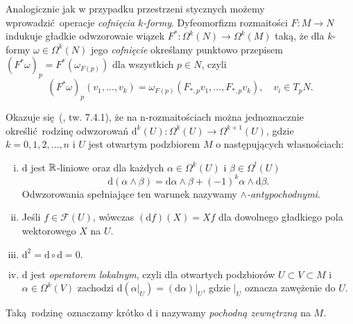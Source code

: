 


Analogicznie jak w przypadku przestrzeni stycznych możemy wprowadzić operacje \emph{cofnięcia \(k\)-formy}. Dyfeomorfizm rozmaitości \(F:M\to N\) indukuje gładkie odwzorowaie wiązek \(F^\ast:\Omega^k(N)\to\Omega^{k}(M)\) taką, że dla \(k\)-formy \(\omega\in\Omega^k(N)\) jego \emph{cofnięcie} określamy punktowo przepisem \((F^\ast \omega)_p = F^\ast(\omega_{F(p)})\) dla wszystkich \(p\in N\), czyli
\begin{equation*}
    (F^\ast\omega)_p(v_1, \dots, v_k) = \omega_{F(p)}(F_{\ast,p}v_1, \dots, F_{\ast,p}v_k),\quad v_i\in T_p N.
\end{equation*}

Okazuje się (\cite{marsden}, tw. 7.4.1), że na n-rozmaitościach można jednoznacznie określić rodzinę odwzorowań \(\mathrm{d}^k(U): \Omega^k(U)\to \Omega^{k+1}(U)\), gdzie \(k=0, 1, 2, \dots, n\) i \(U\) jest otwartym podzbiorem \(M\) o następujących własnościach:
\begin{enumerate}[i)]
    \item \(\mathrm{d}\) jest \(\mathbb{R}\)-liniowe oraz dla każdych \(\alpha\in \Omega^k(U)\) i \(\beta\in \Omega^l(U)\)
        \begin{equation*}
            \mathrm{d}(\alpha \wedge \beta) = \mathrm{d}\alpha \wedge \beta + (-1)^k \alpha \wedge \mathrm{d}\beta.
        \end{equation*}
        Odwzorowania spełniające ten warunek nazywamy \emph{\(\wedge\)-antypochodnymi}.
    \item Jeśli \(f\in\mathcal{F}(U)\), wówczas \((\mathrm{d}f)(X)=Xf\) dla dowolnego gładkiego pola wektorowego \(X\) na \(U\).
    \item \(\mathrm{d^2} = \mathrm{d} \circ \mathrm{d} = 0.\)
    \item \(\mathrm{d}\) jest \emph{operatorem lokalnym}, czyli dla otwartych podzbiorów \(U \subset V \subset M\) i \(\alpha\in\Omega^k(V)\) zachodzi \(\mathrm{d}(\left.\alpha\right|_U)  = \left.(\mathrm{d}\alpha)\right|_U\), gdzie \(|_U\) oznacza zawężenie do \(U\).
\end{enumerate}
Taką rodzinę oznaczamy krótko \(\mathrm{d}\) i nazywamy \emph{pochodną zewnętrzną} na \(M\). 


